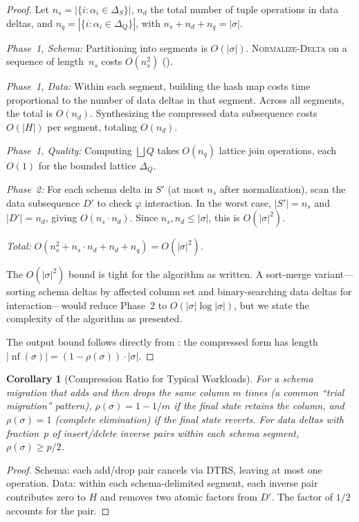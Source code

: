 \documentclass[11pt,a4paper]{article}
\newtheorem{corollary}[theorem]{Corollary}
\theoremstyle{definition}
\newcommand{\DeltaS}{\Delta_{\!S}}
\newcommand{\DeltaQ}{\Delta_{\!Q}}
\DeclareMathOperator{\nf}{nf}
\begin{document}
\begin{proof}
Let $n_s = |\{i : \alpha_i \in \DeltaS\}|$, $n_d$ the total number of
tuple operations in data deltas, and $n_q = |\{i : \alpha_i \in \DeltaQ\}|$,
with $n_s + n_d + n_q = |\sigma|$.

\emph{Phase~1, Schema:}  Partitioning into segments is $O(|\sigma|)$.
\textsc{Normalize-Delta} on a sequence of length~$n_s$ costs $O(n_s^2)$
().

\emph{Phase~1, Data:}  Within each segment, building the hash map costs
time proportional to the number of data deltas in that segment.  Across all
segments, the total is $O(n_d)$.  Synthesizing the compressed data
subsequence costs $O(|H|)$ per segment, totaling $O(n_d)$.

\emph{Phase~1, Quality:}  Computing $\bigsqcup Q$ takes $O(n_q)$ lattice
join operations, each $O(1)$ for the bounded lattice $\DeltaQ$.

\emph{Phase~2:}  For each schema delta in $S'$ (at most $n_s$ after
normalization), scan the data subsequence $D'$ to check $\varphi$
interaction.  In the worst case, $|S'| = n_s$ and $|D'| = n_d$, giving
$O(n_s \cdot n_d)$.  Since $n_s, n_d \leq |\sigma|$, this is $O(|\sigma|^2)$.

\emph{Total:}  $O(n_s^2 + n_s \cdot n_d + n_d + n_q) = O(|\sigma|^2)$.

The $O(|\sigma|^2)$ bound is tight for the algorithm as written.  A
sort-merge variant---sorting schema deltas by affected column set and
binary-searching data deltas for interaction---would reduce Phase~2 to
$O(|\sigma| \log |\sigma|)$, but we state the complexity of the algorithm
as presented.

The output bound follows directly from :
the compressed form has length $|\nf(\sigma)| = (1 - \rho(\sigma))
\cdot |\sigma|$.
\end{proof}

\begin{corollary}[Compression Ratio for Typical Workloads]\label{cor:compression}
For a schema migration that adds and then drops the same column $m$ times
(a common ``trial migration'' pattern), $\rho(\sigma) = 1 - 1/m$ if the
final state retains the column, and $\rho(\sigma) = 1$ (complete elimination)
if the final state reverts.  For data deltas with fraction~$p$ of
insert/delete inverse pairs within each schema segment,
$\rho(\sigma) \geq p/2$.
\end{corollary}

\begin{proof}
Schema: each add/drop pair cancels via DTRS, leaving at most one operation.
Data: within each schema-delimited segment, each inverse pair contributes
zero to $H$ and removes two atomic factors from $D'$.  The factor of $1/2$
accounts for the pair.
\end{proof}
\end{document}
